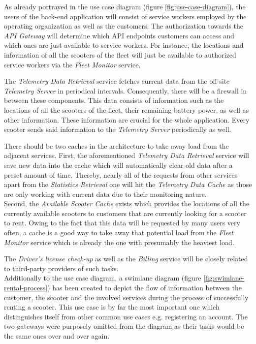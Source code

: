 \documentclass[12pt,a4paper,twoside]{report}
\begin{document}
As already portrayed in the use case diagram (figure \ref{fig:use-case-diagram}),
the users of the back-end application will consist of service workers employed
by the operating organization as well as the customers.
The authorization towards the \textit{API Gateway} will determine which
API endpoints customers can access and which ones are just available to
service workers. For instance, the locations and information of all the scooters
of the fleet will just be available to authorized service workers via the
\textit{Fleet Monitor} service.

The \textit{Telemetry Data Retrieval} service fetches current data from the
off-site \textit{Telemetry Server} in periodical intervals.
Consequently, there will be a firewall in between these components.
This data consists of information such as the locations of all the scooters
of the fleet, their remaining battery power, as well as other information.
These information are crucial for the whole application.
Every scooter sends said information to the \textit{Telemetry Server}
periodically as well.

There should be two caches in the architecture to take away load from the
adjacent services. First, the aforementioned \textit{Telemetry Data Retrieval}
service will save new data into the cache which will automatically clear old
data after a preset amount of time. Thereby, nearly all of the requests from
other services apart from the \textit{Statistics Retrieval} one will hit the
\textit{Telemetry Data Cache} as those are only working with current data due
to their monitoring nature.\\
Second, the \textit{Available Scooter Cache} exists which provides the locations
of all the currently available scooters to customers that are currently looking
for a scooter to rent. Owing to the fact that this data will be requested by
many users very often, a cache is a good way to take away that potential load
from the \textit{Fleet Monitor} service which is already the one with
presumably the heaviest load.

The \textit{Driver's license check-up} as well as the \textit{Billing} service
will be closely related to third-party providers of such tasks.\\

Additionally to the use case diagram, a swimlane diagram
(figure \ref{fig:swimlane-rental-process}) has been created to depict
the flow of information between the customer, the scooter and the
involved services during the process of successfully renting a scooter.
This use case is by far the most important one which distinguishes itself
from other common use cases e.g. registering an account.
The two gateways were purposely omitted from the diagram as their tasks would
be the same ones over and over again.
\end{document}
